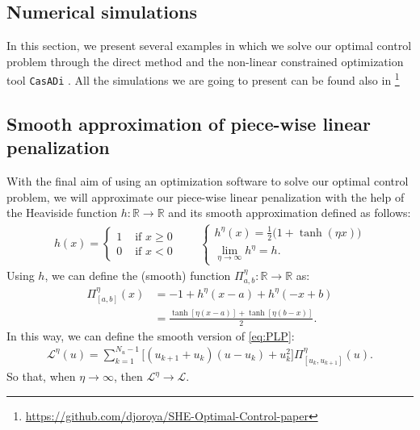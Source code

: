 \documentclass[twocolumn]{autart}    %
\begin{document}
\begin{remark}
\section{Numerical simulations}\label{sec:Simulations}

In this section, we present several examples in which we solve our optimal control problem through the direct method and the non-linear constrained optimization tool \texttt{CasADi} \cite{Andersson2019}. All the simulations we are going to present can be found also in \footnote{\href{https://github.com/djoroya/SHE-Optimal-Control-paper}{https://github.com/djoroya/SHE-Optimal-Control-paper}}
%
\subsection{Smooth approximation of piece-wise linear penalization}

With the final aim of using an optimization software to solve our optimal control problem, we will approximate our piece-wise linear penalization with the help of the Heaviside function $h:\mathbb{R} \rightarrow \mathbb{R}$ and its smooth approximation defined as follows: 
\begin{align*}
    h(x) = \begin{cases}
        1 & \text{ if } x \geq 0 \\ 0 & \text{ if } x < 0
    \end{cases}    
    \hspace{2em} 
    \begin{cases}
        \displaystyle h^\eta(x) = \frac 12\big(1 + \tanh(\eta x)\big) \\[7pt] \displaystyle \lim_{\eta\to\infty} h^\eta = h.
    \end{cases}
\end{align*}
Using $h$, we can define the (smooth) function $\Pi_{a,b}^\eta:\mathbb{R} \rightarrow \mathbb{R}$ as:
\begin{align*}
    \Pi_{[a,b]}^\eta(x) &= - 1 + h^\eta(x-a) + h^\eta(-x+b) 
    \\[5pt]
    &= \frac{\tanh[\eta( x -a)] + \tanh[\eta (b-x)]}{2}.
\end{align*}
In this way, we can define the smooth version of \eqref{eq:PLP}:
\begin{align*}
    \mathcal{L}^\eta(u) = \sum_{k = 1}^{N_u-1} \big[ (u_{k+1}+u_{k}) (u-u_k) + u_k^2 \big] \Pi^\eta_{[u_k,u_{k+1}]}(u).
\end{align*}
So that, when $\eta \rightarrow \infty$, then $\mathcal{L}^\eta \rightarrow \mathcal{L}$. 


\end{remark}
\end{document}
